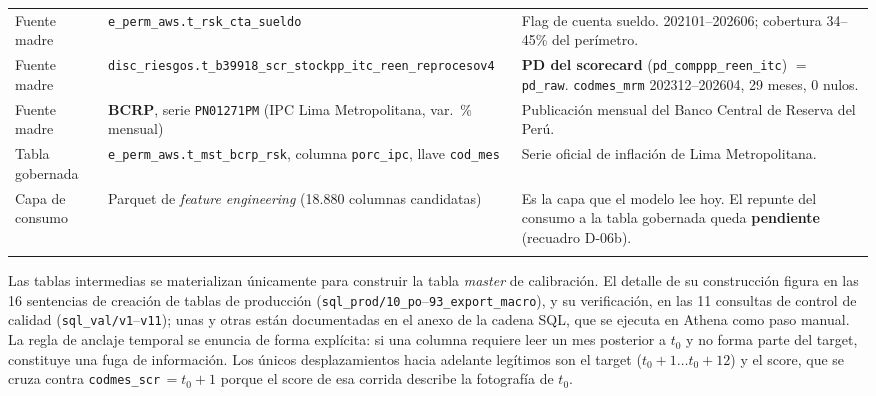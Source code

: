 \documentclass[12pt, a4paper]{article}
\begin{document}
\begin{table}[H]
\begin{tabular}{p{2.5cm}p{5.3cm}p{5.5cm}}
Fuente madre & \texttt{e\_perm\_aws.}\allowbreak\texttt{t\_rsk\_cta\_sueldo} & Flag de cuenta sueldo. 202101--202606; cobertura 34--45\% del perímetro. \\
Fuente madre & \texttt{disc\_riesgos.}\allowbreak\texttt{t\_b39918\_scr\_stockpp\_itc\_}\allowbreak\texttt{reen\_reprocesov4} & \textbf{PD del scorecard} (\texttt{pd\_comppp\_reen\_itc}) $=$ \texttt{pd\_raw}. \texttt{codmes\_mrm} 202312--202604, 29 meses, 0 nulos. \\
Fuente madre & \textbf{BCRP}, serie \texttt{PN01271PM} (IPC Lima Metropolitana, var.\ \% mensual) & Publicación mensual del Banco Central de Reserva del Perú. \\
Tabla gobernada & \texttt{e\_perm\_aws.}\allowbreak\texttt{t\_mst\_bcrp\_rsk}, columna \texttt{porc\_ipc}, llave \texttt{cod\_mes} & Serie oficial de inflación de Lima Metropolitana. \\
Capa de consumo & Parquet de \emph{feature engineering} (18.880 columnas candidatas) & Es la capa que el modelo lee hoy. El repunte del consumo a la tabla gobernada queda \textbf{pendiente} (recuadro D-06b). \\\\
\bottomrule
\end{tabular}
\end{table}


\noindent Las tablas intermedias se materializan únicamente para construir la tabla \emph{master}
de calibración. El detalle de su construcción figura en las 16 sentencias de creación de tablas
de producción (\texttt{sql\_prod/10\_po}--\texttt{93\_export\_macro}), y su verificación, en las 11
consultas de control de calidad (\texttt{sql\_val/v1}--\texttt{v11}); unas y otras están
documentadas en el anexo de la cadena SQL, que se ejecuta en Athena como paso manual. La regla de
anclaje temporal se enuncia de forma explícita: si una columna requiere leer un mes posterior a
$t_0$ y no forma parte del target, constituye una fuga de información. Los únicos desplazamientos
hacia adelante legítimos son el target ($t_0{+}1\ldots t_0{+}12$) y el score, que se cruza contra
\texttt{codmes\_scr}$\,=t_0{+}1$ porque el score de esa corrida describe la fotografía de $t_0$.
\end{document}
